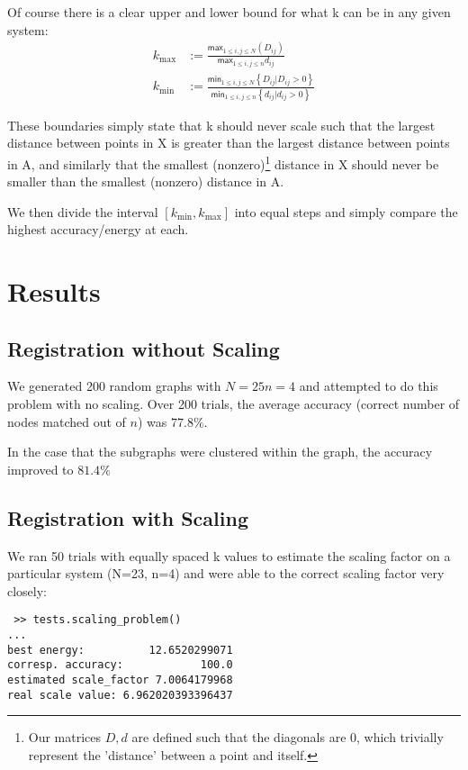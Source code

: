 \documentclass[10pt,twocolumn]{article}
\begin{document}
{Of course there is a clear upper and lower bound for what k can be in any given system:
\[
  \begin{aligned}
    k_{\mathrm{max}} &:= \frac{\mathsf{max}_{1\leq i,j\leq N}(D_{ij})}{\mathsf{max}_{1\leq i,j \leq n} d_{ij}} \\
  k_{\mathrm{min}} &:= \frac{\mathsf{min}_{1 \leq i,j \leq N }\left\{D_{ij} | D_{ij} > 0\right\}}{\mathsf{min}_{1 \leq i,j \leq n }\left\{d_{ij} | d_{ij} > 0\right\}}
\end{aligned}
\]

These boundaries simply state that k should never scale such that the largest
distance between points in X is greater than the largest distance between
points in A, and similarly that the smallest (nonzero)\footnote{Our matrices
$D, d$ are defined such that the diagonals are 0, which trivially represent the
'distance' between a point and itself.} distance in X should never be smaller
than the smallest (nonzero) distance in A.

We then divide the interval $[k_{\mathrm{min}} , k_{\mathrm{max}}]$ into equal
steps and simply compare the highest accuracy/energy at each.

\section{Results}

\subsection{Registration without Scaling}
We generated 200 random graphs with $N=25 n=4$ and attempted to do this problem with no scaling.
Over 200 trials, the average accuracy (correct number of nodes matched out of $n$) was $77.8\%$.

In the case that the subgraphs were clustered within the graph, the accuracy improved to $81.4\%$

\subsection{Registration with Scaling}

We ran 50 trials with equally spaced k values to estimate the scaling factor on a particular system (N=23, n=4) and were able to the correct scaling factor very closely:

\begin{verbatim} >> tests.scaling_problem()
...
best energy:          12.6520299071
corresp. accuracy:            100.0
estimated scale_factor 7.0064179968
real scale value: 6.962020393396437\end{verbatim}

}
\end{document}
